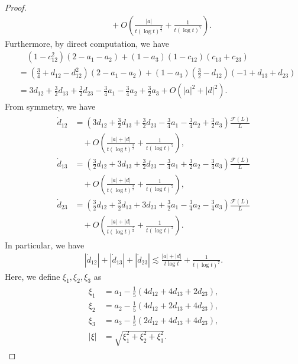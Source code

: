 \documentclass[reqno]{amsart}
\theoremstyle{plain}
\theoremstyle{definition}
\numberwithin{equation}{section}
\newcommand{\1}{\mathbbm{1}}
\begin{document}
\begin{proof}
\begin{align*}
&\quad+O\left(\frac{|a|}{t(\log{t})^{\frac{3}{2}}}+\frac{1}{t(\log{t})^7}\right).
\end{align*}
Furthermore, by direct computation, we have
\begin{align*}
&\quad (1-c_{12}^2)(2-a_1-a_2)+(1-a_3)(1-c_{12})(c_{13}+c_{23})
\\
&=\left(\frac{3}{4}+d_{12}-d_{12}^2\right)(2-a_1-a_2)+(1-a_3)\left(\frac{3}{2}-d_{12}\right)(-1+d_{13}+d_{23})
\\
&=3d_{12}+\frac{3}{2}d_{13}+\frac{3}{2}d_{23}-\frac{3}{4}a_1-\frac{3}{4}a_2+\frac{3}{2}a_3+O(|a|^2+|d|^2).
\end{align*}
From symmetry, we have
\begin{align}\label{djkoderev}
\begin{aligned}
\dot{d}_{12}&=\left( 3d_{12}+\frac{3}{2}d_{13}+\frac{3}{2}d_{23}-\frac{3}{4}a_1-\frac{3}{4}a_2+\frac{3}{2}a_3\right)\frac{\mathcal{F}(L)}{L}
\\
&\quad +O\left(\frac{|a|+|d|}{t(\log{t})^{\frac{3}{2}}}+\frac{1}{t(\log{t})^7}\right),
\\
\dot{d}_{13}&=\left(\frac{3}{2}d_{12}+3d_{13}+\frac{3}{2}d_{23}-\frac{3}{4}a_1+\frac{3}{2}a_2-\frac{3}{4}a_3\right)\frac{\mathcal{F}(L)}{L}
\\
&\quad+O\left(\frac{|a|+|d|}{t(\log{t})^{\frac{3}{2}}}+\frac{1}{t(\log{t})^7}\right),
\\
\dot{d}_{23}&=\left(\frac{3}{2}d_{12}+\frac{3}{2}d_{13}+3d_{23}+\frac{3}{2}a_1-\frac{3}{4}a_2-\frac{3}{4}a_3\right)\frac{\mathcal{F}(L)}{L}
\\
&\quad+O\left(\frac{|a|+|d|}{t(\log{t})^{\frac{3}{2}}}+\frac{1}{t(\log{t})^7}\right).
\end{aligned}
\end{align}
In particular, we have
\begin{align}\label{dbibunes}
|\dot{d}_{12}|+|\dot{d}_{13}|+|\dot{d}_{23}|\lesssim \frac{|a|+|d|}{t\log{t}}+\frac{1}{t(\log{t})^7}.
\end{align}
Here, we define $\xi_1,\xi_2,\xi_3$ as 
\begin{align}\label{xidef}
\begin{aligned}
\xi_1&=a_1-\frac{1}{5}(4d_{12}+4d_{13}+2d_{23}),
\\
\xi_2&=a_2-\frac{1}{5}(4d_{12}+2d_{13}+4d_{23}),
\\
\xi_3&=a_3-\frac{1}{5}(2d_{12}+4d_{13}+4d_{23}),
\\
|\xi|&=\sqrt{\xi_1^2+\xi_2^2+\xi_3^2}.
\end{aligned}
\end{align}

\end{proof}
\end{document}
